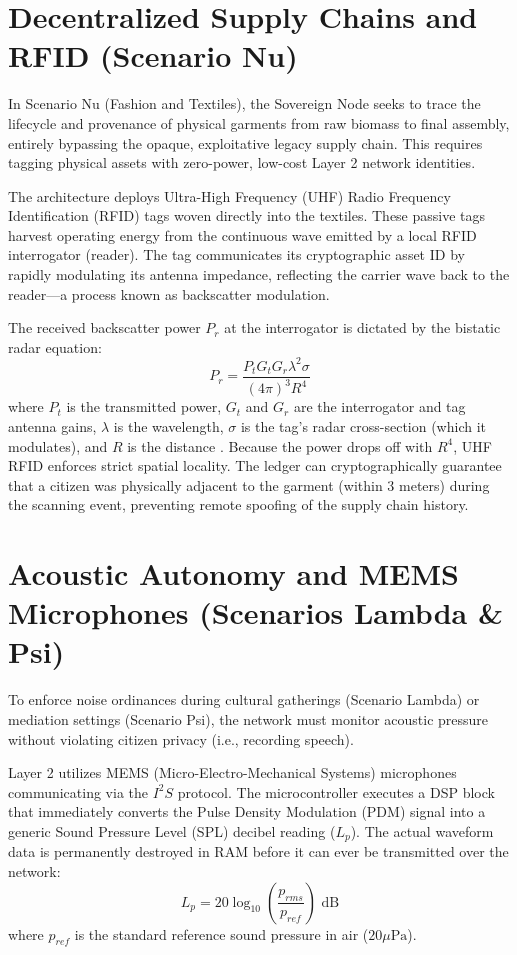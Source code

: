 \section{Decentralized Supply Chains and RFID (Scenario Nu)}
In Scenario Nu (Fashion and Textiles), the Sovereign Node seeks to trace the lifecycle and provenance of physical garments from raw biomass to final assembly, entirely bypassing the opaque, exploitative legacy supply chain. This requires tagging physical assets with zero-power, low-cost Layer 2 network identities. 

The architecture deploys Ultra-High Frequency (UHF) Radio Frequency Identification (RFID) tags woven directly into the textiles. These passive tags harvest operating energy from the continuous wave emitted by a local RFID interrogator (reader). The tag communicates its cryptographic asset ID by rapidly modulating its antenna impedance, reflecting the carrier wave back to the reader—a process known as backscatter modulation. 

The received backscatter power $P_r$ at the interrogator is dictated by the bistatic radar equation:
\begin{equation}
P_r = \frac{P_t G_t G_r \lambda^2 \sigma}{(4\pi)^3 R^4}
\end{equation}
where $P_t$ is the transmitted power, $G_t$ and $G_r$ are the interrogator and tag antenna gains, $\lambda$ is the wavelength, $\sigma$ is the tag's radar cross-section (which it modulates), and $R$ is the distance \cite{dobkin2012rf}. Because the power drops off with $R^4$, UHF RFID enforces strict spatial locality. The ledger can cryptographically guarantee that a citizen was physically adjacent to the garment (within 3 meters) during the scanning event, preventing remote spoofing of the supply chain history.

\section{Acoustic Autonomy and MEMS Microphones (Scenarios Lambda \& Psi)}
To enforce noise ordinances during cultural gatherings (Scenario Lambda) or mediation settings (Scenario Psi), the network must monitor acoustic pressure without violating citizen privacy (i.e., recording speech). 

Layer 2 utilizes MEMS (Micro-Electro-Mechanical Systems) microphones communicating via the $I^2S$ protocol. The microcontroller executes a DSP block that immediately converts the Pulse Density Modulation (PDM) signal into a generic Sound Pressure Level (SPL) decibel reading ($L_p$). The actual waveform data is permanently destroyed in RAM before it can ever be transmitted over the network:
\begin{equation}
L_p = 20 \log_{10} \left( \frac{p_{rms}}{p_{ref}} \right) \text{ dB}
\end{equation}
where $p_{ref}$ is the standard reference sound pressure in air ($20 \mu\text{Pa}$).

